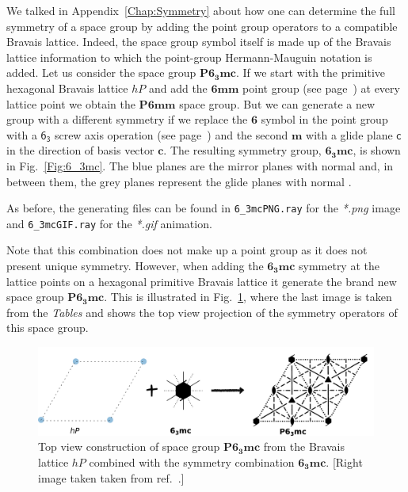 We talked in Appendix~\ref{Chap:Symmetry} about how one can determine the full symmetry of a space group by adding the point group operators to a compatible Bravais lattice. Indeed, the space group symbol itself is made up of the Bravais lattice information to which the point-group Hermann-Mauguin notation is added. Let us consider the space group $\mathbf{P6_3mc}$. If we start with the primitive hexagonal Bravais lattice $hP$ and add the $\mathbf{6mm}$ point group (see page~\pageref{subChap:pointGroup}) at every lattice point we obtain the $\mathbf{P6mm}$ space group. But we can generate a new group with a different symmetry if we replace the $\mathbf{6}$ symbol in the point group with a $\mathsf{6_3}$ screw axis operation (see page~\pageref{sec:screw}) and the second $\mathbf{m}$ with a glide plane $\mathsf{c}$ in the direction of basis vector $\mathbf{c}$. The resulting symmetry group, $\mathbf{6_3mc}$, is shown in Fig.~\ref{Fig:6_3mc}. The blue planes are the mirror planes with normal  and, in between them, the grey planes represent the glide planes with normal . 


As before, the generating files can be found in \texttt{6\_3mcPNG.ray} for the \textit{*.png} image and \texttt{6\_3mcGIF.ray} for the \textit{*.gif} animation. 


Note that this combination does not make up a point group as it does not present unique symmetry. However, when adding the $\mathbf{6_3mc}$ symmetry at the lattice points on a hexagonal primitive Bravais lattice it generate the brand new space group $\mathbf{P6_3mc}$. This is illustrated in Fig.~\ref{Fig:P63mc}, where the last image is taken from the \textit{Tables} and shows the top view projection of the symmetry operators of this space group. 

\begin{figure}
    \centering
\includegraphics[width=0.9\linewidth]{Figures/spaceGroup.png}
\caption[Space group $\mathbf{P6_3mc}$.]{Top view construction of space group $\mathbf{P6_3mc}$ from the Bravais lattice $hP$ combined with the symmetry combination $\mathbf{6_3mc}$. [Right image taken taken from ref.~\cite{IntTableCrysA}.]}
\label{Fig:P63mc}
\end{figure}

